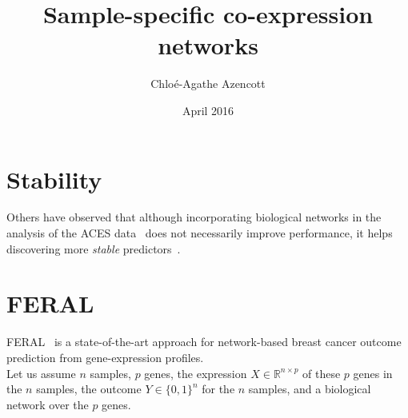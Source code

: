 \documentclass[12pt,a4paper]{article}
\title{Sample-specific co-expression networks}
\author{Chloé-Agathe Azencott}
\date{April 2016}
\begin{document}
\maketitle

\section{Stability}
Others have observed that although incorporating biological networks in the analysis of the ACES data~\cite{staiger2013} does not necessarily improve performance, it helps discovering more {\em stable} predictors~\cite{allahyar2015}.

\section{FERAL}
FERAL~\cite{allahyar2015} is a state-of-the-art approach for network-based breast cancer outcome prediction from gene-expression profiles.\\

Let us assume $n$ samples, $p$ genes, the expression $X \in \mathbb{R}^{n \times p}$ of these $p$ genes in the $n$ samples, the outcome $Y \in \{0, 1\}^n$ for the $n$ samples, and a biological network over the $p$ genes.\\
\end{document}
